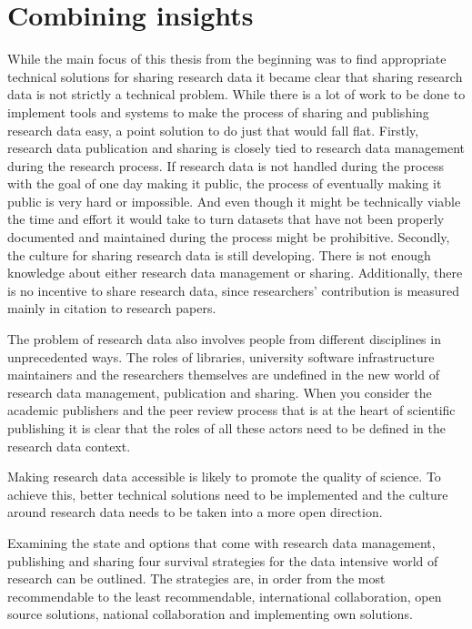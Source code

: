 \section{Combining insights}

While the main focus of this thesis from the beginning was to find
appropriate technical solutions for sharing research data it became clear
that sharing research data is not strictly a technical problem. While there is
a lot of work to be done to implement tools and systems to make the process of
sharing and publishing research data easy, a point solution to do just that
would fall flat. Firstly, research data publication and sharing is closely
tied to research data management during the research process. If research data
is not handled during the process with the goal of one day making it public,
the process of eventually making it public is very hard or impossible. And even
though it might be technically viable the time and effort it would take to
turn datasets that have not been properly documented and maintained during the
process might be prohibitive. Secondly, the culture for sharing research data
is still developing. There is not enough knowledge about either research data management
or sharing. Additionally, there is no incentive to share research data, since
researchers' contribution is measured mainly in citation to research papers.

The problem of research data also involves people from different disciplines
in unprecedented ways. The roles of libraries, university software
infrastructure maintainers and the researchers themselves are undefined in
the new world of research data management, publication and sharing. When you
consider the academic publishers and the peer review process that is at the
heart of scientific publishing it is clear that the roles of all
these actors need to be defined in the research data context.

Making research data accessible is likely to promote the quality of science.
To achieve this, better technical solutions need to be implemented and the
culture around research data needs to be taken into a more open direction.

Examining the state and options that come with research data management,
publishing and sharing four survival strategies for the data intensive world
of research can be outlined. The strategies are, in order from the most recommendable
to the least recommendable, international collaboration,
open source solutions, national collaboration and implementing own solutions.


